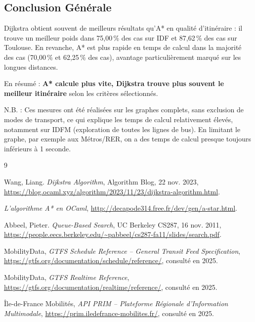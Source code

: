 \documentclass[12pt,a4paper]{article}
\begin{document}
\subsection*{Conclusion Générale}

Dijkstra obtient souvent de meilleurs résultats qu'A* en qualité d'itinéraire : il trouve un meilleur poids dans 75,00\,\% des cas sur IDF et 87,62\,\% des cas sur Toulouse. En revanche, A* est plus rapide en temps de calcul dans la majorité des cas (70,00\,\% et 62,25\,\% des cas), avantage particulièrement marqué sur les longues distances.

En résumé : \textbf{A* calcule plus vite, Dijkstra trouve plus souvent le meilleur itinéraire} selon les critères sélectionnés.

N.B. : Ces mesures ont été réalisées sur les graphes complets, sans exclusion de modes de transport, ce qui explique les temps de calcul relativement élevés, notamment sur IDFM (exploration de toutes les lignes de bus). En limitant le graphe, par exemple aux Métros/RER, on a des temps de calcul presque toujours inférieurs à 1 seconde.

\begin{thebibliography}{9}

Wang, Liang.
\textit{Dijkstra Algorithm},
Algorithm Blog, 22 nov. 2023,
\url{https://blog.ocaml.xyz/algorithm/2023/11/23/dijkstra-algorithm.html}.

\textit{L'algorithme A* en OCaml},
\url{http://decapode314.free.fr/dev/gen/a-star.html}.

Abbeel, Pieter.
\textit{Queue-Based Search},
UC Berkeley CS287, 16 nov. 2011,
\url{https://people.eecs.berkeley.edu/~pabbeel/cs287-fa11/slides/search.pdf}.

MobilityData,
\textit{GTFS Schedule Reference -- General Transit Feed Specification},
\url{https://gtfs.org/documentation/schedule/reference/}, consulté en 2025.

MobilityData,
\textit{GTFS Realtime Reference},
\url{https://gtfs.org/documentation/realtime/reference/}, consulté en 2025.

Île-de-France Mobilités,
\textit{API PRIM -- Plateforme Régionale d'Information Multimodale},
\url{https://prim.iledefrance-mobilites.fr/}, consulté en 2025.

\end{thebibliography}
\end{document}
